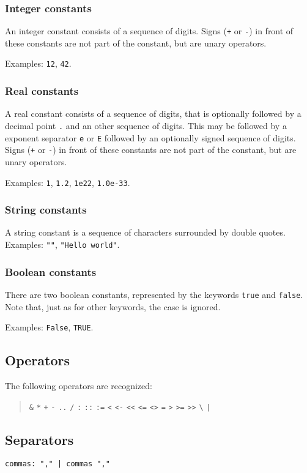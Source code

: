 \documentclass[a4paper]{article}
\begin{document}
\subsubsection{Integer constants}
An integer constant consists of a sequence of digits.
Signs (\verb'+' or \verb'-') in front
of these constants are not part of the constant, but are unary operators.
\par
Examples: \verb"12", \verb"42".
\subsubsection{Real constants}
A real constant consists of a sequence of digits, that is optionally followed
by a decimal point \verb"." and an other sequence of digits. This may
be followed by a exponent separator \verb"e" or \verb"E" followed by an
optionally signed sequence of digits.
Signs (\verb'+' or \verb'-') in front
of these constants are not part of the constant, but are unary operators.
\par
Examples: \verb"1", \verb"1.2", \verb"1e22", \verb"1.0e-33".
\subsubsection{String constants}
A string constant is a sequence of characters surrounded by double quotes.
Examples: \verb'""', \verb'"Hello world"'.
\subsubsection{Boolean constants}
There are two boolean constants, represented by the keywords {\tt true}
and {\tt false}. Note that, just as for other keywords, the case
is ignored.
\par
Examples: {\tt False}, {\tt TRUE}.
\subsection{Operators}
The following operators are recognized:
\begin{quote}
\verb"&"
\verb"*"
\verb"+"
\verb"-"
\verb".."
\verb"/"
\verb":"
\verb"::"
\verb":="
\verb"<"
\verb"<-"
\verb"<<"
\verb"<="
\verb"<>"
\verb"="
\verb">"
\verb">="
\verb">>"
\verb"\"
\verb"|"
\end{quote}
\subsection{Separators}
\begin{verbatim}
commas: "," | commas ","
\end{verbatim}
\end{document}
